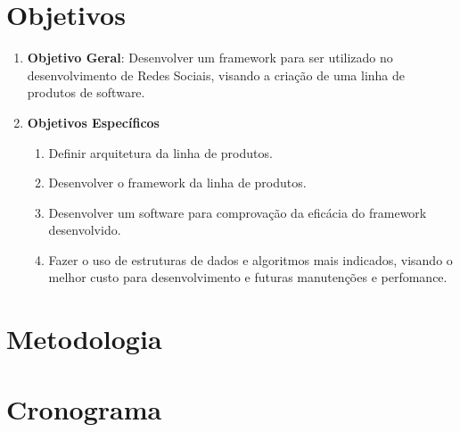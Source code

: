 \section*{Objetivos}

\begin{enumerate}
	\item \textbf{Objetivo Geral}: Desenvolver um framework para ser utilizado no desenvolvimento de Redes Sociais, visando a criação de uma linha de produtos de software.

	\item \textbf{Objetivos Específicos}
	\begin{enumerate}
		\item Definir arquitetura da linha de produtos.
		\item Desenvolver o framework da linha de produtos.
		\item Desenvolver um software para comprovação da eficácia do framework desenvolvido.
		\item Fazer o uso de estruturas de dados e algoritmos mais indicados, visando o melhor custo para desenvolvimento e futuras manutenções e perfomance.
	\end{enumerate}
\end{enumerate}
\section*{Metodologia}

\section*{Cronograma}

\postextual

 



